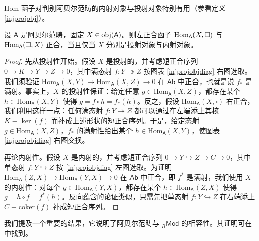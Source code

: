 
Hom 函子对判别阿贝尔范畴的内射对象与投射对象特别有用（参看定义 \ref{injprojobj}）。

\begin{Lem}\label{Homforinjprojobj}
	设 $\mathsf{A}$ 是阿贝尔范畴，固定 $X\in\textup{obj}(\mathsf{A})$。则左正合函子 $\textup{Hom}_\mathsf{A}(X,\square)$ 与 $\textup{Hom}_\mathsf{A}(\square,X)$ 正合，当且仅当 $X$ 分别是投射对象与内射对象。
\end{Lem}

\begin{proof}
	先从投射性开始。假设 $X$ 是投射的，并考虑短正合序列 $0\rightarrow K\rightarrow Y\rightarrow Z\rightarrow 0$，其中满态射 $f:Y\twoheadrightarrow Z$ 按图表 \eqref{injprojobjdiag} 右图选取。我们须验证 $\text{Hom}_\mathsf{A}(X,Y)\rightarrow\text{Hom}_\mathsf{A}(X,Z)\rightarrow 0$ 在 $\mathsf{Ab}$ 中正合，也就是说 $f_*$ 是满射。事实上，$X$ 的投射性保证：给定任意 $g\in\text{Hom}_\mathsf{A}(X,Z)$，都存在某个 $h\in\text{Hom}_\mathsf{A}(X,Y)$ 使得 $g=f\circ h=f_*(h)$。反之，假设 $\text{Hom}_\mathsf{A}(X,\square)$ 右正合，我们利用这样一点：任何满态射 $f:Y\twoheadrightarrow Z$ 都可以通过在左端添上其核 $K\equiv\ker(f)$ 而补成上述形状的短正合序列。于是，给定态射 $g\in\text{Hom}_\mathsf{A}(X,Z)$，$f_*$ 的满射性给出某个 $h\in\text{Hom}_\mathsf{A}(X,Y)$，使图表 \eqref{injprojobjdiag} 右图交换。

	再论内射性。假设 $X$ 是内射的，并考虑短正合序列 $0\rightarrow Y\hookrightarrow Z\rightarrow C\rightarrow 0$，其中单态射 $f:Y\hookrightarrow Z$ 按 \eqref{injprojobjdiag} 左图选取。为证明 $\text{Hom}_\mathsf{A}(Z,X)\rightarrow\text{Hom}_\mathsf{A}(Y,X)\rightarrow 0$ 在 $\mathsf{Ab}$ 中正合，即 $f^*$ 是满射，我们使用 $X$ 的内射性：对每个 $g\in\text{Hom}_\mathsf{A}(Y,X)$，都存在某个 $h\in\text{Hom}_\mathsf{A}(Z,X)$ 使得 $g=h\circ f=f^*(h)$。反向蕴含的论证类似，只需先把单态射 $f:Y\hookrightarrow Z$ 在右端添上 $C\equiv\text{coker}(f)$ 补成短正合序列。
\end{proof}

我们提及一个重要的结果，它说明了阿贝尔范畴与 ${}_R\mathsf{Mod}$ 的相容性。其证明可在 \cite[section 1.6]{[Wei94]} 中找到。

